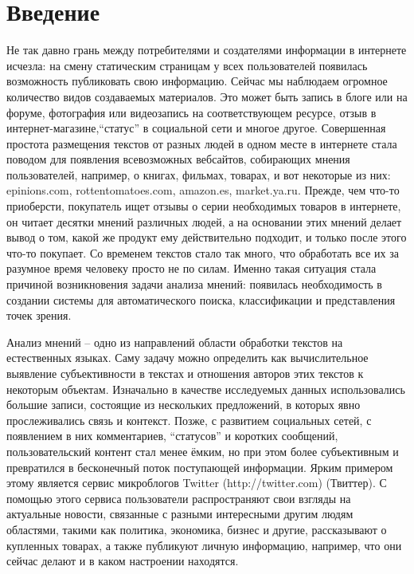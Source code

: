 
\section*{Введение}

Не так давно грань между потребителями и создателями информации в интернете
исчезла: на смену статическим страницам у всех пользователей появилась
возможность публиковать свою информацию. Сейчас мы наблюдаем огромное
количество видов создаваемых материалов. Это может быть запись
в блоге или на форуме, фотография или видеозапись на соответствующем
ресурсе, отзыв в интернет-магазине,``статус'' в социальной сети и многое другое.
Совершенная простота размещения текстов от разных людей в одном месте
в интернете стала поводом для появления всевозможных вебсайтов, собирающих мнения
пользователей, например, о книгах, фильмах, товарах, и вот некоторые из них:
epinions.com, rottentomatoes.com, amazon.es, market.ya.ru. Прежде, чем что-то приоберсти,
покупатель ищет отзывы о серии необходимых товаров в интернете, он читает
десятки мнений различных людей, а на основании этих мнений делает вывод о том,
какой же продукт ему действительно подходит, и только после этого что-то покупает.
Со временем текстов стало так много, что обработать все их за разумное время человеку просто
не по силам. Именно такая ситуация стала причиной возникновения
задачи анализа мнений: появилась необходимость в создании системы для
автоматического поиска, классификации и представления точек зрения.

Анализ мнений -- одно из направлений области обработки текстов на естественных
языках. Саму задачу можно определить как вычислительное выявление
субъективности в текстах и отношения авторов этих текстов к некоторым объектам.
Изначально в качестве исследуемых данных использовались большие записи,
состоящие из нескольких предложений, в которых явно прослеживались связь и
контекст. Позже, с развитием социальных сетей, с появлением в них комментариев,
``статусов'' и  коротких сообщений, пользовательский контент стал менее ёмким,
но при этом более субъективным и превратился в бесконечный поток поступающей
информации. Ярким примером этому является сервис микроблогов
Twitter (http://twitter.com) (Твиттер). С помощью этого сервиса пользователи распространяют
свои взгляды на актуальные новости, связанные с разными интересными
другим людям областями, такими как политика, экономика, бизнес и другие,
рассказывают о купленных товарах, а также публикуют личную информацию, например,
что они сейчас делают и в каком настроении находятся.

